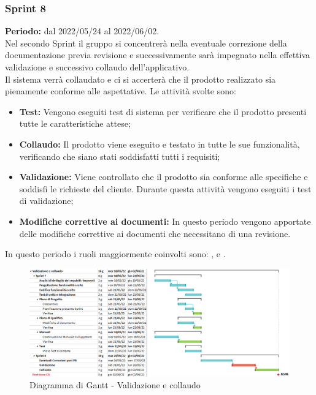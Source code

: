\subsubsection{Sprint 8} \label{subsubsection:sprint_8}
\textbf{Periodo:} dal 2022/05/24 al 2022/06/02.
\bigskip
\\Nel secondo Sprint\glo{} il gruppo si concentrerà nella eventuale correzione della documentazione previa revisione e successivamente sarà impegnato nella effettiva validazione e successivo collaudo dell'applicativo.
\\Il sistema verrà collaudato e ci si accerterà che il prodotto realizzato sia pienamente conforme alle aspettative.
Le attività svolte sono:
\begin{itemize}
  \item \textbf{Test:} Vengono eseguiti test di sistema per verificare che il prodotto presenti tutte le caratteristiche attese;
  \item \textbf{Collaudo:} Il prodotto viene eseguito e testato in tutte le sue funzionalità, verificando che siano stati soddisfatti tutti i requisiti;
  \item \textbf{Validazione:} Viene controllato che il prodotto sia conforme alle specifiche e soddisfi le richieste del cliente.
        Durante questa attività vengono eseguiti i test di validazione;
  \item \textbf{Modifiche correttive ai documenti:} In questo periodo vengono apportate delle modifiche correttive ai documenti che necessitano di una revisione.
\end{itemize}
In questo periodo i ruoli maggiormente coinvolti sono: \roleDesignerLow{}, \roleProgrammerLow{} e \roleVerifierLow{}.
\bigskip
\begin{figure}[H]
  \centering
  \includegraphics[scale=0.55]{immagini/validazione_collaudo.png}
  \caption{Diagramma di Gantt - Validazione e collaudo}
\end{figure}
\pagebreak